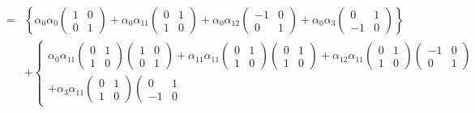 \documentclass[aps,preprint]{revtex4}
\begin{document}
\begin{eqnarray}
&=&\left\{ \alpha _{0}\alpha _{0}\left( 
\begin{array}{cc}
1 & 0 \\ 
0 & 1%
\end{array}%
\right) +\alpha _{0}\alpha _{11}\left( 
\begin{array}{cc}
0 & 1 \\ 
1 & 0%
\end{array}%
\right) +\alpha _{0}\alpha _{12}\left( 
\begin{array}{cc}
-1 & 0 \\ 
0 & 1%
\end{array}%
\right) +\alpha _{0}\alpha _{3}\left( 
\begin{array}{cc}
0 & 1 \\ 
-1 & 0%
\end{array}%
\right) \right\} \\
&&+\left\{ 
\begin{array}{c}
\alpha _{0}\alpha _{11}\left( 
\begin{array}{cc}
0 & 1 \\ 
1 & 0%
\end{array}%
\right) \left( 
\begin{array}{cc}
1 & 0 \\ 
0 & 1%
\end{array}%
\right) +\alpha _{11}\alpha _{11}\left( 
\begin{array}{cc}
0 & 1 \\ 
1 & 0%
\end{array}%
\right) \left( 
\begin{array}{cc}
0 & 1 \\ 
1 & 0%
\end{array}%
\right) +\alpha _{12}\alpha _{11}\left( 
\begin{array}{cc}
0 & 1 \\ 
1 & 0%
\end{array}%
\right) \left( 
\begin{array}{cc}
-1 & 0 \\ 
0 & 1%
\end{array}%
\right) \\ 
+\alpha _{3}\alpha _{11}\left( 
\begin{array}{cc}
0 & 1 \\ 
1 & 0%
\end{array}%
\right) \left( 
\begin{array}{cc}
0 & 1 \\ 
-1 & 0%
\end{array}%

\end{array}
\end{eqnarray}
\end{document}
